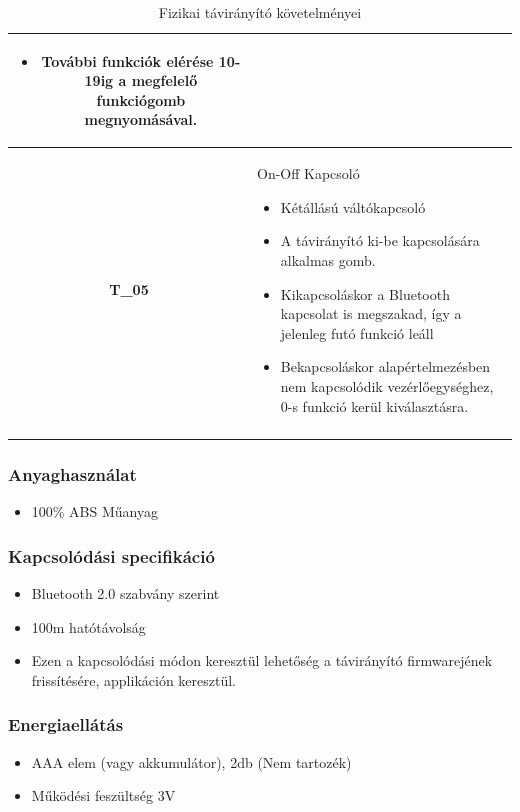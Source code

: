 \documentclass{article}
\begin{document}
\begin{longtable}{|c|p{14cm}|}
       \begin{itemize}
        \item További funkciók elérése 10-19ig a megfelelő funkciógomb megnyomásával. 
        \end{itemize}
       \\\hline
       \textbf{T\_05}  & On-Off Kapcsoló 
       \begin{itemize}
        \item Kétállású váltókapcsoló
        \item A távirányító ki-be kapcsolására alkalmas gomb.
        \item Kikapcsoláskor a Bluetooth kapcsolat is megszakad, így a jelenleg futó funkció leáll
        \item Bekapcsoláskor alapértelmezésben nem kapcsolódik vezérlőegységhez, 0-s funkció kerül kiválasztásra.
        \end{itemize}
       \\\hline
       
\hline
\caption{Fizikai távirányító követelményei}
\end{longtable}
\endgroup

\subsubsection{Anyaghasználat}
    \begin{itemize}
        \item 100\% ABS Műanyag
    \end{itemize}


\subsubsection{Kapcsolódási specifikáció}
\begin{itemize}
    \item Bluetooth 2.0 szabvány szerint
    \item 100m hatótávolság
    \item Ezen a kapcsolódási módon keresztül lehetőség a távirányító firmwarejének frissítésére, applikáción keresztül.
\end{itemize}

\subsubsection{Energiaellátás}
\begin{itemize}
    \item AAA elem (vagy akkumulátor), 2db (Nem tartozék)
    \item Működési feszültség 3V
\end{itemize}
\end{document}
